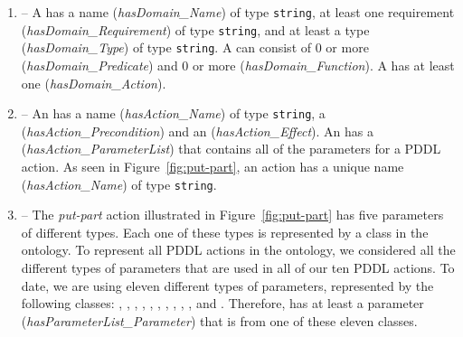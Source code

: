 %
%
\begin{enumerate}
\item {} -- A  has a name (\emph{hasDomain\_Name}) of type
\texttt{string}, at least one requirement (\emph{hasDomain\_Requirement}) of type
\texttt{string}, and at least a type (\emph{hasDomain\_Type}) of type \texttt{string}.
A  can consist of 0 or more  (\emph{hasDomain\_Predicate})
and 0 or more  (\emph{hasDomain\_Function}). A  has
at least one  (\emph{hasDomain\_Action}).
\item {} -- An  has a name (\emph{hasAction\_Name}) of
type \texttt{string}, a  (\emph{hasAction\_Precondition}) and
an  (\emph{hasAction\_Effect}). An  has a
 (\emph{hasAction\_ParameterList}) that contains all of the
parameters for a PDDL action. As seen in Figure~\ref{fig:put-part}, an action
has a unique name (\emph{hasAction\_Name}) of type \texttt{string}.
\item {} -- The \textsl{put-part} action illustrated in
Figure~\ref{fig:put-part} has five parameters of different types. Each one of
these types is represented by a class in the  ontology. To represent
all PDDL actions in the  ontology, we considered all the different types
of parameters that are used in all of our ten PDDL actions. To date, we are using eleven
different types of parameters, represented by the following classes:
, , , ,
, , ,
, , , and .
Therefore,  has at least a parameter
(\emph{hasParameterList\_Parameter}) that is from one of these eleven classes.


\end{enumerate}
